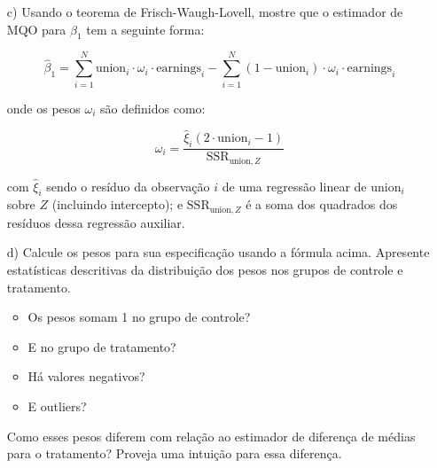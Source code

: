 \documentclass[10pt,a4paper]{article}
\begin{document}
\begin{enumerate}
\begin{enumerate}
 			\item[c)]Usando o teorema de Frisch-Waugh-Lovell, mostre que o estimador de MQO para $\beta_1$ tem a seguinte forma:
 		
 		\begin{equation}
 			\hat{\beta}_1 = \sum_{i=1}^N  \text{union}_i \cdot \omega_i  \cdot \text{earnings}_i -  \sum_{i=1}^N (1-  \text{union}_i )\cdot \omega_i  \cdot \text{earnings}_i 
 		\end{equation}
 		
 		onde os pesos $\omega_i$ são definidos como:
 		
 		\begin{equation}
 			\omega_i  = \frac{\hat{\xi}_i (2 \cdot \text{union}_i-1)}{\text{SSR}_{\text{union},Z}}
 		\end{equation}
 		
 		com $\hat{\xi}_i$ sendo o resíduo da observação $i$ de uma regressão linear de $\text{union}_i$ sobre $Z$ (incluindo intercepto); e $\text{SSR}_{\text{union},Z}$ é a soma dos quadrados dos resíduos dessa regressão auxiliar.
 		
 		\item[d)] Calcule os pesos para sua especificação usando a fórmula acima. Apresente estatísticas descritivas da distribuição dos pesos nos grupos de controle e tratamento. 
 		
 		\begin{itemize}
 			\item Os pesos somam 1 no grupo de controle?
 			\item E no grupo de tratamento?
 			\item Há valores negativos?
 			\item E outliers?
 		\end{itemize}
 		
 		Como esses pesos diferem com relação ao estimador de diferença de médias para o tratamento? Proveja uma intuição para essa diferença.
 		
 	\end{enumerate}
 	
 \end{enumerate}
\end{document}
